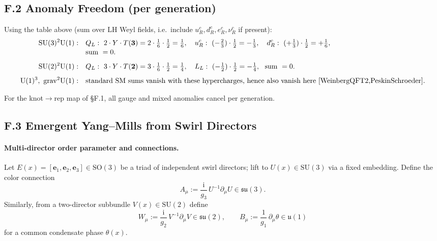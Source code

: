 \documentclass[11pt]{article}
\newcommand{\ii}{\mathrm{i}}
\begin{document}
\subsection*{F.2 Anomaly Freedom (per generation)}

Using the table above (sum over LH Weyl fields, i.e.\ include $u_R^c,d_R^c,e_R^c,\nu_R^c$ if present):
\begin{align*}
	\mathrm{SU}(3)^2\mathrm U(1):\quad
	&Q_L:\ 2\cdot Y\cdot T(\mathbf 3)=2\cdot \tfrac{1}{6}\cdot \tfrac{1}{2}=\tfrac{1}{6},\quad
	u_R^c:\ (-\tfrac{2}{3})\cdot \tfrac{1}{2}=-\tfrac{1}{3},\quad
	d_R^c:\ (+\tfrac{1}{3})\cdot \tfrac{1}{2}=+\tfrac{1}{6},\\[-2pt]
	&\text{sum }=0.\\[4pt]
	\mathrm{SU}(2)^2\mathrm U(1):\quad
	&Q_L:\ 3\cdot Y\cdot T(\mathbf 2)=3\cdot \tfrac{1}{6}\cdot \tfrac{1}{2}=\tfrac{1}{4},\quad
	L_L:\ (-\tfrac{1}{2})\cdot \tfrac{1}{2}=-\tfrac{1}{4},\ \ \text{sum }=0.\\[4pt]
	\mathrm U(1)^3,\ \mathrm{grav}^2\mathrm U(1):\quad
	&\text{standard SM sums vanish with these hypercharges, hence also vanish here~\cite{WeinbergQFT2,PeskinSchroeder}.}
\end{align*}
\begin{theorem}
	For the knot$\to$rep map of \S F.1, all gauge and mixed anomalies cancel per generation.
\end{theorem}

\subsection*{F.3 Emergent Yang--Mills from Swirl Directors}

\paragraph{Multi-director order parameter and connections.}
Let $E(x)=[\mathbf e_1,\mathbf e_2,\mathbf e_3]\in\mathrm{SO}(3)$ be a triad of independent swirl directors; lift to $U(x)\in\mathrm{SU}(3)$ via a fixed embedding. Define the color connection
\[
	A_\mu := \frac{\ii}{g_3}\,U^{-1}\partial_\mu U \in \mathfrak{su}(3).
\]
Similarly, from a two-director subbundle $V(x)\in \mathrm{SU}(2)$ define
\[
	W_\mu := \frac{\ii}{g_2}\,V^{-1}\partial_\mu V \in \mathfrak{su}(2),
	\qquad
	B_\mu := \frac{1}{g_1}\,\partial_\mu \theta \in \mathfrak u(1)
\]
for a common condensate phase $\theta(x)$.
\end{document}
